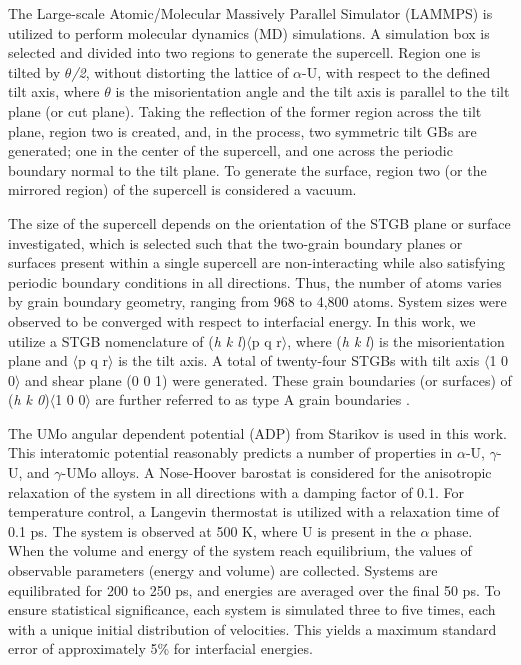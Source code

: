 \documentclass{anstrans}
\begin{document}
The Large-scale Atomic/Molecular Massively Parallel Simulator (LAMMPS) \cite{plimpton1995} is utilized to perform molecular dynamics (MD) simulations. A simulation box is selected and divided into two regions to generate the supercell. Region one is tilted by \textit{$\theta$/2}, without distorting the lattice of $\alpha$-U, with respect to the defined tilt axis, where \textit{$\theta$} is the misorientation angle and the tilt axis is parallel to the tilt plane (or cut plane). Taking the reflection of the former region across the tilt plane, region two is created, and, in the process, two symmetric tilt GBs are generated; one in the center of the supercell, and one across the periodic boundary normal to the tilt plane. To generate the surface, region two (or the mirrored region) of the supercell is considered a vacuum. 

The size of the supercell depends on the orientation of the STGB plane or surface investigated, which is selected such that the two-grain boundary planes or surfaces present within a single supercell are non-interacting while also satisfying periodic boundary conditions in all directions. Thus, the number of atoms varies by grain boundary geometry, ranging from 968 to 4,800 atoms. System sizes were observed to be converged with respect to interfacial energy. In this work, we utilize a STGB nomenclature of (\textit{h k l})$\langle$p q r$\rangle$, where (\textit{h k l}) is the misorientation plane and $\langle$p q r$\rangle$ is the tilt axis. A total of twenty-four STGBs with tilt axis $\langle$1 0 0$\rangle$ and shear plane (0 0 1) were generated. These grain boundaries (or surfaces) of (\textit{h k 0})$\langle$1 0 0$\rangle$ are further referred to as type A grain boundaries \cite{mahbuba2021}.

The UMo angular dependent potential (ADP) from Starikov \cite{starikov2018} is used in this work. This interatomic potential reasonably predicts a number of properties in $\alpha$-U, $\gamma$-U, and $\gamma$-UMo alloys. A Nose-Hoover barostat is considered for the anisotropic relaxation of the system in all directions with a damping factor of 0.1. For temperature control, a Langevin thermostat is utilized with a relaxation time of 0.1 ps. The system is observed at 500 K, where U is present in the $\alpha$ phase. When the volume and energy of the system reach equilibrium, the values of observable parameters (energy and volume) are collected. Systems are equilibrated for 200 to 250 ps, and energies are averaged over the final 50 ps. To ensure statistical significance, each system is simulated three to five times, each with a unique initial distribution of velocities. This yields a maximum standard error of approximately 5\% for interfacial energies.
\end{document}
